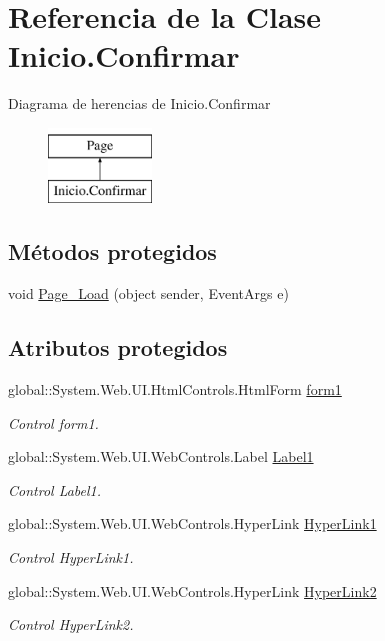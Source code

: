 \hypertarget{classInicio_1_1Confirmar}{}\section{Referencia de la Clase Inicio.\+Confirmar}
\label{classInicio_1_1Confirmar}
Diagrama de herencias de Inicio.\+Confirmar\begin{figure}[H]
\begin{center}
\leavevmode
\includegraphics[height=2.000000cm]{classInicio_1_1Confirmar}
\end{center}
\end{figure}
\subsection*{Métodos protegidos}
\begin{DoxyCompactItemize}
\item 
void \mbox{\hyperlink{classInicio_1_1Confirmar_a47f2d7d6e91b4e672a1b954710c65daf}{Page\+\_\+\+Load}} (object sender, Event\+Args e)
\end{DoxyCompactItemize}
\subsection*{Atributos protegidos}
\begin{DoxyCompactItemize}
\item 
global\+::\+System.\+Web.\+U\+I.\+Html\+Controls.\+Html\+Form \mbox{\hyperlink{classInicio_1_1Confirmar_a30f1390871512f4d2eb2a6e5a635f9f5}{form1}}
\begin{DoxyCompactList}\small\item\em Control form1. \end{DoxyCompactList}\item 
global\+::\+System.\+Web.\+U\+I.\+Web\+Controls.\+Label \mbox{\hyperlink{classInicio_1_1Confirmar_a0422c86bf977b315fd681b02c0f5f352}{Label1}}
\begin{DoxyCompactList}\small\item\em Control Label1. \end{DoxyCompactList}\item 
global\+::\+System.\+Web.\+U\+I.\+Web\+Controls.\+Hyper\+Link \mbox{\hyperlink{classInicio_1_1Confirmar_aa4a4ab67f1e6964cdc3e83eb66293fa9}{Hyper\+Link1}}
\begin{DoxyCompactList}\small\item\em Control Hyper\+Link1. \end{DoxyCompactList}\item 
global\+::\+System.\+Web.\+U\+I.\+Web\+Controls.\+Hyper\+Link \mbox{\hyperlink{classInicio_1_1Confirmar_adbc12b387c3590f83453888d8192db9a}{Hyper\+Link2}}
\begin{DoxyCompactList}\small\item\em Control Hyper\+Link2. \end{DoxyCompactList}\end{DoxyCompactItemize}


